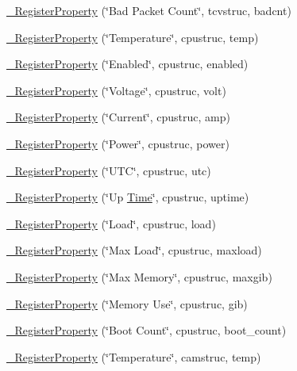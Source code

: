 \begin{DoxyCompactItemize}
\item 
\hyperlink{namespacecubesat_a58867368867ef441cccc4f382118c12e}{\+\_\+\+Register\+Property} (\char`\"{}Bad Packet Count\char`\"{}, tcvstruc, badcnt)
\item 
\hyperlink{namespacecubesat_a8bb108fc4eecb2cc32a9493d16551311}{\+\_\+\+Register\+Property} (\char`\"{}Temperature\char`\"{}, cpustruc, temp)
\item 
\hyperlink{namespacecubesat_aafc89b5a15524c4858f5f1bcbe47fce1}{\+\_\+\+Register\+Property} (\char`\"{}Enabled\char`\"{}, cpustruc, enabled)
\item 
\hyperlink{namespacecubesat_a219472c75c8170664f0815ad1aa6fe3a}{\+\_\+\+Register\+Property} (\char`\"{}Voltage\char`\"{}, cpustruc, volt)
\item 
\hyperlink{namespacecubesat_ab831e0d9017df503adcdef8aa5a03db6}{\+\_\+\+Register\+Property} (\char`\"{}Current\char`\"{}, cpustruc, amp)
\item 
\hyperlink{namespacecubesat_a37c2ab55da643392e430844cc3d07e14}{\+\_\+\+Register\+Property} (\char`\"{}Power\char`\"{}, cpustruc, power)
\item 
\hyperlink{namespacecubesat_a9a148e6f640a1840126adb10e372100c}{\+\_\+\+Register\+Property} (\char`\"{}U\+TC\char`\"{}, cpustruc, utc)
\item 
\hyperlink{namespacecubesat_a0b61587ddba14bf262a6797d65ac9970}{\+\_\+\+Register\+Property} (\char`\"{}Up \hyperlink{classcubesat_1_1Time}{Time}\char`\"{}, cpustruc, uptime)
\item 
\hyperlink{namespacecubesat_a87075078ddc87c5940c67eb5c439d273}{\+\_\+\+Register\+Property} (\char`\"{}Load\char`\"{}, cpustruc, load)
\item 
\hyperlink{namespacecubesat_a613dc2d54d1023b6e891f6bc7feae004}{\+\_\+\+Register\+Property} (\char`\"{}Max Load\char`\"{}, cpustruc, maxload)
\item 
\hyperlink{namespacecubesat_a824f59271908e2b7bce5180975e3f55b}{\+\_\+\+Register\+Property} (\char`\"{}Max Memory\char`\"{}, cpustruc, maxgib)
\item 
\hyperlink{namespacecubesat_ad636c97c076ecaa994e0636c225e03ec}{\+\_\+\+Register\+Property} (\char`\"{}Memory Use\char`\"{}, cpustruc, gib)
\item 
\hyperlink{namespacecubesat_a8d3688b83c4e307a6a7485937bf1244c}{\+\_\+\+Register\+Property} (\char`\"{}Boot Count\char`\"{}, cpustruc, boot\+\_\+count)
\item 
\hyperlink{namespacecubesat_a8109b10d6a2729e44afdcb77e088454d}{\+\_\+\+Register\+Property} (\char`\"{}Temperature\char`\"{}, camstruc, temp)

\end{DoxyCompactItemize}
